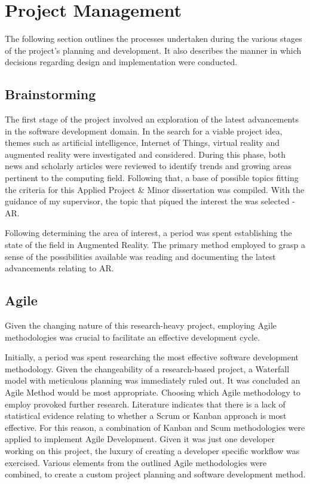 
\section{Project Management}
The following section outlines the processes undertaken during the various stages of the project’s planning and development. It also describes the manner in which decisions regarding design and implementation were conducted. 

\subsection{Brainstorming}
The first stage of the project involved an exploration of the latest advancements in the software development domain. In the search for a viable project idea, themes such as artificial intelligence, Internet of Things, virtual reality and augmented reality were investigated and considered. During this phase, both news and scholarly articles were reviewed to identify trends and growing areas pertinent to the computing field. Following that, a base of possible topics fitting the criteria for this Applied Project \& Minor dissertation was compiled. With the guidance of my supervisor, the topic that piqued the interest the was selected - AR. 

Following determining the area of interest, a period was spent establishing the state of the field in Augmented Reality. The primary method employed to grasp a sense of the possibilities available was reading and documenting the latest advancements relating to AR.


\subsection{Agile}
Given the changing nature of this research-heavy project, employing Agile methodologies was crucial to facilitate an effective development cycle.

Initially, a period was spent researching the most effective software development methodology. Given the changeability of a research-based project, a Waterfall model with meticulous planning was immediately ruled out. It was concluded an Agile Method would be most appropriate. Choosing which Agile methodology to employ provoked further research. Literature indicates that there is a lack of statistical evidence relating to whether a Scrum or Kanban approach is most effective\cite{sugimori1977toyota}. For this reason, a combination of Kanban and Scum methodologies were applied to implement Agile Development. Given it was just one developer working on this project, the luxury of creating a developer specific workflow was exercised. Various elements from the outlined Agile methodologies were combined, to create a custom project planning and software development method.


